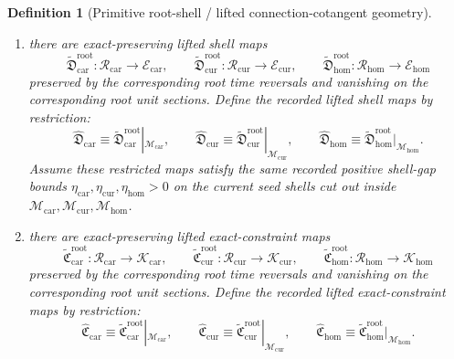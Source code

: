 \documentclass[11pt]{article}
\newcommand{\TensorConstraintTarget}{\mathcal K_{\mathrm{car}}}
\newcommand{\CurConstraintTarget}{\mathcal K_{\mathrm{cur}}}
\newcommand{\HomConstraintTarget}{\mathcal K_{\mathrm{hom}}}
\newcommand{\TensorShellTarget}{\mathcal E_{\mathrm{car}}}
\newcommand{\CurShellTarget}{\mathcal E_{\mathrm{cur}}}
\newcommand{\HomShellTarget}{\mathcal E_{\mathrm{hom}}}
\newcommand{\TensorShellGap}{\eta_{\mathrm{car}}}
\newcommand{\CurShellGap}{\eta_{\mathrm{cur}}}
\newcommand{\HomShellGap}{\eta_{\mathrm{hom}}}
\newcommand{\TensorOriginSpace}{\mathcal M_{\mathrm{car}}}
\newcommand{\CurOriginSpace}{\mathcal M_{\mathrm{cur}}}
\newcommand{\HomOriginSpace}{\mathcal M_{\mathrm{hom}}}
\newcommand{\TensorOriginSection}{\mathfrak S_{\mathrm{car}}^{\mathrm{orig}}}
\newcommand{\CurOriginSection}{\mathfrak S_{\mathrm{cur}}^{\mathrm{orig}}}
\newcommand{\HomOriginSection}{\mathfrak S_{\mathrm{hom}}^{\mathrm{orig}}}
\newcommand{\TensorOriginGap}{\epsilon_{\mathrm{car}}^{\mathrm{orig}}}
\newcommand{\CurOriginGap}{\epsilon_{\mathrm{cur}}^{\mathrm{orig}}}
\newcommand{\HomOriginGap}{\epsilon_{\mathrm{hom}}^{\mathrm{orig}}}
\newcommand{\TensorLiftedShellSection}{\widehat{\mathfrak D}_{\mathrm{car}}}
\newcommand{\CurLiftedShellSection}{\widehat{\mathfrak D}_{\mathrm{cur}}}
\newcommand{\HomLiftedShellSection}{\widehat{\mathfrak D}_{\mathrm{hom}}}
\newcommand{\TensorOriginConstraintMap}{\widehat{\mathfrak C}_{\mathrm{car}}}
\newcommand{\CurOriginConstraintMap}{\widehat{\mathfrak C}_{\mathrm{cur}}}
\newcommand{\HomOriginConstraintMap}{\widehat{\mathfrak C}_{\mathrm{hom}}}
\newcommand{\TensorRootSpace}{\mathcal R_{\mathrm{car}}}
\newcommand{\CurRootSpace}{\mathcal R_{\mathrm{cur}}}
\newcommand{\HomRootSpace}{\mathcal R_{\mathrm{hom}}}
\newcommand{\TensorLiftedAmbientSection}{\widetilde{\mathfrak S}_{\mathrm{car}}^{\mathrm{orig}}}
\newcommand{\CurLiftedAmbientSection}{\widetilde{\mathfrak S}_{\mathrm{cur}}^{\mathrm{orig}}}
\newcommand{\HomLiftedAmbientSection}{\widetilde{\mathfrak S}_{\mathrm{hom}}^{\mathrm{orig}}}
\newcommand{\TensorRootLiftedShellSection}{\widetilde{\mathfrak D}_{\mathrm{car}}^{\mathrm{root}}}
\newcommand{\CurRootLiftedShellSection}{\widetilde{\mathfrak D}_{\mathrm{cur}}^{\mathrm{root}}}
\newcommand{\HomRootLiftedShellSection}{\widetilde{\mathfrak D}_{\mathrm{hom}}^{\mathrm{root}}}
\newcommand{\TensorRootConstraintMap}{\widetilde{\mathfrak C}_{\mathrm{car}}^{\mathrm{root}}}
\newcommand{\CurRootConstraintMap}{\widetilde{\mathfrak C}_{\mathrm{cur}}^{\mathrm{root}}}
\newcommand{\HomRootConstraintMap}{\widetilde{\mathfrak C}_{\mathrm{hom}}^{\mathrm{root}}}
\newtheorem{definition}{Definition}
\begin{document}
\begin{definition}[Primitive root-shell / lifted connection-cotangent geometry]
\begin{enumerate}
    \begin{equation}
    \TensorOriginSection\equiv\TensorLiftedAmbientSection|_{\TensorOriginSpace},\qquad
    \CurOriginSection\equiv\CurLiftedAmbientSection|_{\CurOriginSpace},\qquad
    \HomOriginSection\equiv\HomLiftedAmbientSection|_{\HomOriginSpace}.
    \label{eq:origin_section_from_root}
    \end{equation}
    Assume these restricted sections satisfy the same recorded positive ambient-generating gap bounds \(\TensorOriginGap,\CurOriginGap,\HomOriginGap>0\) on the current ambient shells cut out inside \(\TensorOriginSpace,\CurOriginSpace,\HomOriginSpace\).
    \item there are exact-preserving lifted shell maps
    \[
    \TensorRootLiftedShellSection:\TensorRootSpace\to\TensorShellTarget,\qquad
    \CurRootLiftedShellSection:\CurRootSpace\to\CurShellTarget,\qquad
    \HomRootLiftedShellSection:\HomRootSpace\to\HomShellTarget
    \]
    preserved by the corresponding root time reversals and vanishing on the corresponding root unit sections. Define the recorded lifted shell maps by restriction:
    \begin{equation}
    \TensorLiftedShellSection\equiv\TensorRootLiftedShellSection|_{\TensorOriginSpace},\qquad
    \CurLiftedShellSection\equiv\CurRootLiftedShellSection|_{\CurOriginSpace},\qquad
    \HomLiftedShellSection\equiv\HomRootLiftedShellSection|_{\HomOriginSpace}.
    \label{eq:lifted_shell_from_root}
    \end{equation}
    Assume these restricted maps satisfy the same recorded positive shell-gap bounds \(\TensorShellGap,\CurShellGap,\HomShellGap>0\) on the current seed shells cut out inside \(\TensorOriginSpace,\CurOriginSpace,\HomOriginSpace\).
    \item there are exact-preserving lifted exact-constraint maps
    \[
    \TensorRootConstraintMap:\TensorRootSpace\to\TensorConstraintTarget,\qquad
    \CurRootConstraintMap:\CurRootSpace\to\CurConstraintTarget,\qquad
    \HomRootConstraintMap:\HomRootSpace\to\HomConstraintTarget
    \]
    preserved by the corresponding root time reversals and vanishing on the corresponding root unit sections. Define the recorded lifted exact-constraint maps by restriction:
    \begin{equation}
    \TensorOriginConstraintMap\equiv\TensorRootConstraintMap|_{\TensorOriginSpace},\qquad
    \CurOriginConstraintMap\equiv\CurRootConstraintMap|_{\CurOriginSpace},\qquad
    \HomOriginConstraintMap\equiv\HomRootConstraintMap|_{\HomOriginSpace}.
    \label{eq:origin_constraint_from_root}

\end{equation}
\end{enumerate}
\end{definition}
\end{document}
